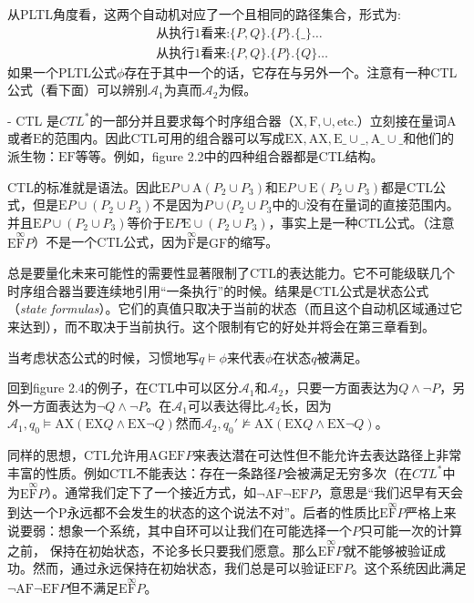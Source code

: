 \documentclass{book}
\begin{document}
    从PLTL角度看，这两个自动机对应了一个且相同的路径集合，形式为:
    \begin{equation*}
      \begin{aligned}
        & \text{从执行1看来:}\{P,Q\}.\{P\}.\{\_\}\dots \\
        & \text{从执行1看来:}\{P,Q\}.\{P\}.\{Q\}\dots
      \end{aligned}
    \end{equation*}
    如果一个PLTL公式$\phi$存在于其中一个的话，它存在与另外一个。注意有一种CTL公式（看下面）可以辨别$\mathcal{A}_1$为真而$\mathcal{A}_2$为假。

    - CTL 是$CTL^*$的一部分并且要求每个时序组合器（$\mathrm{X},\mathrm{F},\cup,$etc.）立刻接在量词$\mathrm{A}$或者$\mathrm{E}$的范围内。因此CTL可用的组合器可以写成$\mathrm{E}\mathrm{X},\mathrm{A}\mathrm{X},\mathrm{E}\_\cup \_,\mathrm{A}\_\cup \_$和他们的派生物：$\mathrm{E}\mathrm{F}$等等。例如，figure 2.2中的四种组合器都是CTL结构。

    CTL的标准就是语法。因此$\mathrm{E}P\cup\mathrm{A}(P_2\cup P_3)$和$\mathrm{E}P\cup\mathrm{E}(P_2\cup P_3)$都是CTL公式，但是$\mathrm{E}P\cup(P_2\cup P_3)$不是因为$P\cup(P_2\cup P_3$中的$\cup$没有在量词的直接范围内。并且$\mathrm{E}P\cup(P_2\cup P_3)$等价于$\mathrm{E}P\mathrm{E}\cup(P_2\cup P_3)$，事实上是一种CTL公式。（注意$\mathrm{E}\overset{\infty}{\mathrm{F}}P$）不是一个CTL公式，因为$\overset{\infty}{\mathrm{F}}$是$\mathrm{G}\mathrm{F}$的缩写。

    总是要量化未来可能性的需要性显著限制了CTL的表达能力。它不可能级联几个时序组合器当要连续地引用“一条执行”的时候。结果是CTL公式是状态公式（{\itshape state formulas}）。它们的真值只取决于当前的状态（而且这个自动机区域通过它来达到），而不取决于当前执行。这个限制有它的好处并将会在第三章看到。

    当考虑状态公式的时候，习惯地写$q\models \phi$来代表$\phi$在状态$q$被满足。

    回到figure 2.4的例子，在CTL中可以区分$\mathcal{A}_1$和$\mathcal{A}_2$，只要一方面表达为$Q \wedge \neg P$，另外一方面表达为$\neg Q \wedge \neg P$。在$\mathcal{A}_1$可以表达得比$\mathcal{A}_2$长，因为$\mathcal{A}_1,q_0 \models \mathrm{A}\mathrm{X}(\mathrm{E}\mathrm{X}Q\wedge\mathrm{E}\mathrm{X}\neg Q)$然而$\mathcal{A}_2,q_0' \nvDash \mathrm{A}\mathrm{X}(\mathrm{E}\mathrm{X}Q\wedge\mathrm{E}\mathrm{X}\neg Q)$。

    同样的思想，CTL允许用$\mathrm{A}\mathrm{G}\mathrm{E}\mathrm{F}P$来表达潜在可达性但不能允许去表达路径上非常丰富的性质。例如CTL不能表达：存在一条路径$P$会被满足无穷多次（在$CTL^*$中为$\mathrm{E}\overset{\infty}{\mathrm{F}}P$）。通常我们定下了一个接近方式，如$\neg\mathrm{A}\mathrm{F}\neg\mathrm{E}\mathrm{F}P$，意思是“我们迟早有天会到达一个P永远都不会发生的状态的这个说法不对”。后者的性质比$\mathrm{E}\overset{\infty}{\mathrm{F}}P$严格上来说要弱：想象一个系统，其中自环可以让我们在可能选择一个$P$只可能一次的计算之前， 保持在初始状态，不论多长只要我们愿意。那么$\mathrm{E}\overset{\infty}{\mathrm{F}}P$就不能够被验证成功。然而，通过永远保持在初始状态，我们总是可以验证$\mathrm{E}\mathrm{F}P$。这个系统因此满足$\neg\mathrm{A}\mathrm{F}\neg\mathrm{E}\mathrm{F}P$但不满足$\mathrm{E}\overset{\infty}{\mathrm{F}}P$。
\end{document}
